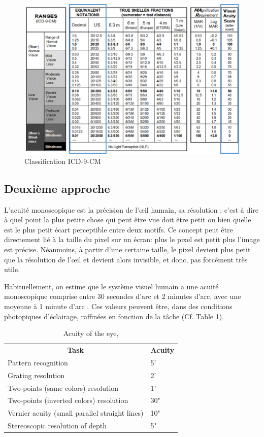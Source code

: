 	\begin{figure}
		\centering
		\includegraphics[scale=.6]{Figures/AcuityICD9CM}
		\caption{Classification ICD-9-CM}
		\label{fig:icd_9_cdm}
	\end{figure}
	
	\subsection{Deuxième approche}
	\par L'acuité monoscopique est la précision de l'œil humain, sa résolution ; c'est à dire à quel point la plus petite chose qui peut être vue doit être petit ou bien quelle est le plus petit écart perceptible entre deux motifs. Ce concept peut être directement lié à la taille du pixel sur un écran: plus le pixel est petit plus l'image est précise. Néanmoins, à partir d'une certaine taille, le pixel devient plus petit que la résolution de l'œil et devient alors invisible, et donc, pas forcément très utile.
	
	\par Habituellement, on estime que le système visuel humain a une acuité monoscopique comprise entre 30 secondes d'arc et 2 minutes d'arc, avec une moyenne à 1 minute d'arc \citep{fuchs_traite_2003}. Ces valeurs peuvent être, dans des conditions photopiques d'éclairage, raffinées en fonction de la tâche \citep{gross_human_2008} (Cf. Table \ref{tab:acuity}).

	\begin{table}[h]
		\centering
		\caption{Acuity of the eye, \citep{gross_human_2008}}
		\label{tab:acuity}
		\small
		\begin{tabular}{ll}
			\multicolumn{1}{c}{\bfseries Task} & \multicolumn{1}{c}{\bfseries Acuity}\\
			Pattern recognition & 5'\\
			Grating resolution & 2'\\
			Two-points (same colors) resolution & 1'\\
			Two-points (inverted colors) resolution & 30"\\
			Vernier acuity (small parallel straight lines) & 10"\\
			Stereoscopic resolution of depth & 5"\\
		\end{tabular}
	\end{table}
	
